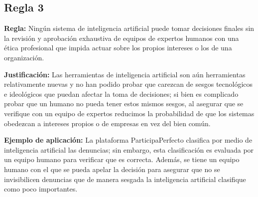 \subsection*{Regla 3}
\begin{itemizeColor}
    \item \textbf{Regla:} 
    Ningún sistema de inteligencia artificial puede tomar decisiones finales sin la revisión y aprobación exhaustiva de equipos de expertos humanos con una ética profesional que impida actuar sobre los propios intereses o los de una organización.
    \item \textbf{Justificación:} 
	    Las herramientas de inteligencia artificial son aún herramientas relativamente nuevas y no han podido probar que carezcan de sesgos tecnológicos e ideológicos que puedan afectar la toma de decisiones; si bien es complicado probar que un humano no pueda tener estos mismos sesgos, al asegurar que se verifique con un equipo de expertos reducimos la probabilidad de que los sistemas obedezcan a intereses propios o de empresas en vez del bien común.

    \item \textbf{Ejemplo de aplicación:} 
	    La plataforma ParticipaPerfecto clasifica por medio de inteligencia artificial las denuncias; sin embargo, esta clasificación es evaluada por un equipo humano para verificar que es correcta. Además, se tiene un equipo humano con el que se pueda apelar la decisión para asegurar que no se invisibilicen denuncias que de manera sesgada la inteligencia artificial clasifique como poco importantes.
\end{itemizeColor}
